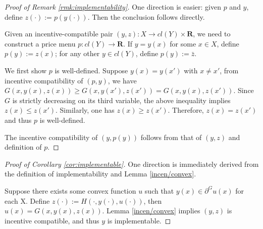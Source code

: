 \documentclass[a4paper, 11pt]{amsart}
\numberwithin{equation}{section}
\theoremstyle{plain}
\theoremstyle{definition}
\theoremstyle{remark}
\newcommand{\R}{\mathbf{R}}
\begin{document}
\vspace{0.3cm}

\begin{proof}[Proof of Remark \ref{rmk:implementability}]
	One direction is easier: given $p$ and $y$, define $z(\cdot):= p(y(\cdot))$. Then the conclusion follows directly. \medskip
	
	Given an incentive-compatible pair $(y, z): X \longrightarrow cl(Y) \times \R$, we need to construct a price menu $p: cl(Y)\longrightarrow \R$. If $y= y(x)$ for some $x\in X$, define $p(y):= z(x)$; for any other $y \in cl(Y)$, define $p(y) := \bar{z}$. \medskip
	
	We first show $p$ is well-defined. Suppose $y(x) = y(x')$ with $x\ne x'$, from incentive compatibility of $(p,y)$, we have $G(x,y(x), z(x)) \ge G(x, y(x'), z(x')) = G(x, y(x), z(x'))$. Since $G$ is strictly decreasing on its third variable, the above inequality implies $z(x) \le z(x')$. Similarly, one has $z(x) \ge z(x')$. Therefore, $z(x) = z(x')$ and thus $p$ is well-defined. \medskip
	
	The incentive compatibility of $(y, p(y))$ follows from that of $(y, z)$ and definition of $p$.
\end{proof}
\vspace{0.3cm}
\begin{proof}[Proof of Corollary \ref{cor:implementable}]
	One direction is immediately derived from the definition of implementability and Lemma \ref{incen/convex}.\medskip
	
	Suppose there exists some convex function $u$ such that $y(x) \in \partial^G u(x)$ for each X. Define $z(\cdot):= H(\cdot, y(\cdot), u(\cdot))$, then $u(x) = G(x, y(x), z(x))$.
	Lemma \ref{incen/convex} implies $(y, z)$ is incentive compatible, and thus $y$ is implementable.
\end{proof}
\vspace{0.3cm}
\end{document}
